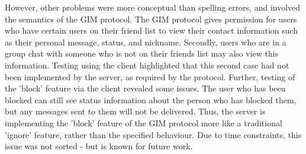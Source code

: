 However, other problems were more conceptual than spelling errors, and involved the semantics of the GIM protocol. The GIM protocol gives permission for users who have certain users on their friend list to view their contact information such as their personal message, status, and nickname. Secondly, users who are in a group chat with someone who is not on their friends list may also view this information. Testing using the client highlighted that this second case had not been implemented by the server, as required by the protocol. Further, testing of the 'block' feature via the client revealed some issues. The user who has been blocked can still see status information about the person who has blocked them, but any messages sent to them will not be delivered. Thus, the server is implementing the 'block' feature of the GIM protocol more like a traditional 'ignore' feature, rather than the specified behaviour. Due to time constraints, this issue was not sorted - but is known for future work.
